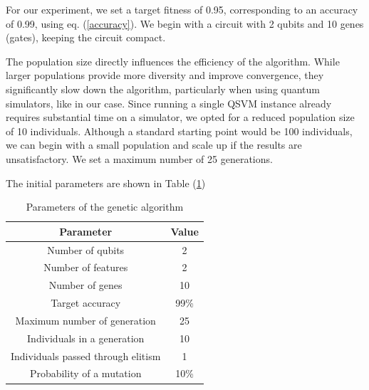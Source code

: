 \documentclass[12pt]{article}
\begin{document}
For our experiment, we set a target fitness of 0.95, corresponding to an accuracy of 0.99, using eq. (\ref{accuracy}). We begin with a circuit with 2 qubits and 10 genes (gates), keeping the circuit compact.

The population size directly influences the efficiency of the algorithm. While larger populations provide more diversity and improve convergence, they significantly slow down the algorithm, particularly when using quantum simulators, like in our case. Since running a single QSVM instance already requires substantial time on a simulator, we opted for a reduced population size of 10 individuals. Although a standard starting point would be 100 individuals, we can begin with a small population and scale up if the results are unsatisfactory. We set a maximum number of 25 generations.

The initial parameters are shown in Table (\ref{tabella accettanza})
\begin{table}[h]
    \centering
    \begin{tabular}{||c c||} 
     \hline
     Parameter & Value  \\ [0.5ex] 
     \hline\hline
     Number of qubits & 2 \\ 
     Number of features & 2  \\
     Number of genes & 10  \\
     Target accuracy & 99\%  \\ 
     Maximum number of generation & 25  \\
     Individuals in a generation & 10  \\ 
     Individuals passed through elitism & 1 \\
     Probability of a mutation & 10\% \\  
     \hline
    \end{tabular}
    \caption{Parameters of the genetic algorithm}
    \label{tabella accettanza}
\end{table}
\end{document}
